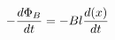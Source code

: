 \documentclass[preview]{standalone}
\begin{document}
\begin{align*}
- {d \Phi_B \over d t}  = - B l {d( x )  \over dt}
\end{align*}
\end{document}
